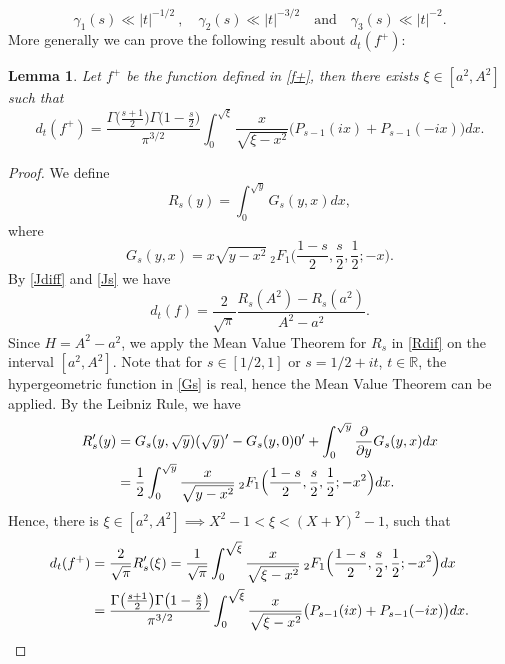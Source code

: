 \documentclass[a4paper,11pt]{amsart}
\newtheorem{lem}[theorem]{Lemma}
\theoremstyle{definition}
\begin{document}
\begin{equation}\label{Gammas}
    \gamma_1(s) \ll |t|^{-1/2}\: ,\quad \gamma_2(s) \ll |t|^{-3/2} \quad \text{and} \quad \gamma_3(s) \ll |t|^{-2}.
\end{equation}
More generally we can prove the following result about $d_t(f^{+})$:
\begin{lem}\label{lem19}
Let $f^{+}$ be the function defined in \eqref{f+}, then there exists $\xi \in [a^2,A^2]$ such that
$$d_t(f^{+})= \frac{\Gamma \big(\frac{s+1}{2}\big)\Gamma \big(1-\frac{s}{2}\big)}{\pi^{3/2}}\int_0^{\sqrt{\xi}}\frac{x}{\sqrt{\xi-x^2}}\big(P_{s-1}(ix)+P_{s-1}(-ix)\big)dx.$$
\end{lem}
\begin{proof}

We define $$R_s(y)=\int_0^{\sqrt{y}} G_s(y,x) dx,$$
where  
\begin{equation}\label{Gs}
    G_s(y,x)=x\sqrt{y-x^2}\:_{2}F_1\Big(\frac{1-s}{2},\frac{s}{2},\frac{1}{2};-x\Big).
\end{equation}
By \eqref{Jdiff} and \eqref{Js} we have 
\begin{equation}\label{Rdif}
    d_t(f)=\frac{2}{\sqrt{\pi}}\frac{R_s(A^2)-R_{s}(a^2)}{A^2-a^2}.
\end{equation}
Since $H=A^2-a^2$, we apply the Mean Value Theorem for $R_s$ in \eqref{Rdif} on the interval $[a^2,A^2]$. Note that for $s \in [1/2,1]$ or $s=1/2+it$, $t \in \mathbb{R}$, the hypergeometric function in \eqref{Gs} is real, hence the Mean Value Theorem can be applied. By the Leibniz Rule, we have
\begin{align}\notag
    \begin{split}
        R'_s(y)&= G_s(y,\sqrt{y})(\sqrt{y})'-G_s(y,0)0'+\int_0^{\sqrt{y}}\frac{\partial}{\partial y}G_s(y,x)dx \\
        &= \frac{1}{2}\int_0^{\sqrt{y}}\frac{x}{\sqrt{y-x^2}}\:_{2}F_1\Big(\frac{1-s}{2},\frac{s}{2},\frac{1}{2};-x^2\Big)dx.
   \end{split}
\end{align}
Hence, there is $\xi\in [a^2,A^2] \implies X^2-1<\xi<(X+Y)^2-1$, such that 
\begin{align}\notag
    \begin{split}
        d_{t}(f^{+})&=\frac{2}{\sqrt{\pi}}R'_s(\xi)=\frac{1}{\sqrt{\pi}}\int_0^{\sqrt{\xi}}\frac{x}{\sqrt{\xi-x^2}}\:_{2}F_1\Big(\frac{1-s}{2},\frac{s}{2},\frac{1}{2};-x^2\Big)dx\\
       &= \frac{\Gamma \big(\frac{s+1}{2}\big)\Gamma \big(1-\frac{s}{2}\big)}{\pi^{3/2}}\int_0^{\sqrt{\xi}}\frac{x}{\sqrt{\xi-x^2}}\big(P_{s-1}(ix)+P_{s-1}(-ix)\big)dx.
    \end{split}
\end{align}
\end{proof}
\end{document}

